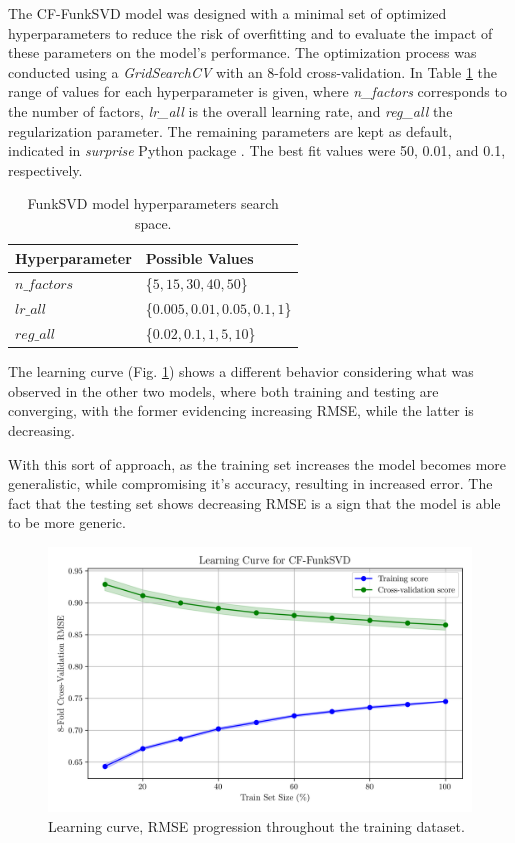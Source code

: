 \documentclass[conference]{IEEEtran}
\begin{document}
The CF-FunkSVD model was designed with a minimal set of optimized hyperparameters to reduce the risk of overfitting and to evaluate the impact of these parameters on the model's performance. The optimization process was conducted using a \textit{GridSearchCV} with an 8-fold cross-validation. In Table \ref{parametrosSVD} the range of values for each hyperparameter is given, where \textit{n\_factors} corresponds to the number of factors, \textit{lr\_all} is the overall learning rate, and \textit{reg\_all} the regularization parameter. The remaining parameters are kept as default, indicated in \textit{surprise} Python package \cite{surprise}. The best fit values were 50, 0.01, and 0.1, respectively.

\begin{table}[H]
\centering
\caption{FunkSVD model hyperparameters search space.}
\label{parametrosSVD}
\begin{tabular}{ll}
\toprule
\textbf{Hyperparameter} & \textbf{Possible Values} \\
\midrule
$n\_factors$ & \{$5,15,30,40,50$\} \\ 
$lr\_all$ & \{$0.005, 0.01, 0.05, 0.1, 1$\} \\ 
$reg\_all$ & \{$0.02,0.1,1,5,10$\} \\ 
\bottomrule
\end{tabular}
\end{table}

The learning curve (Fig. \ref{fig:model03_learningcurve}) shows a different behavior considering what was observed in the other two models, where both training and testing are converging, with the former evidencing increasing RMSE, while the latter is decreasing.

With this sort of approach, as the training set increases the model becomes more generalistic, while compromising it's accuracy, resulting in increased error. The fact that the testing set shows decreasing RMSE is a sign that the model is able to be more generic.

\begin{figure}[H]
    \centering
    \includegraphics[width=1\linewidth]{assets/model03_learningcurve.png}
    \caption{Learning curve, RMSE progression throughout the training dataset.}
    \label{fig:model03_learningcurve}
\end{figure}
\end{document}
